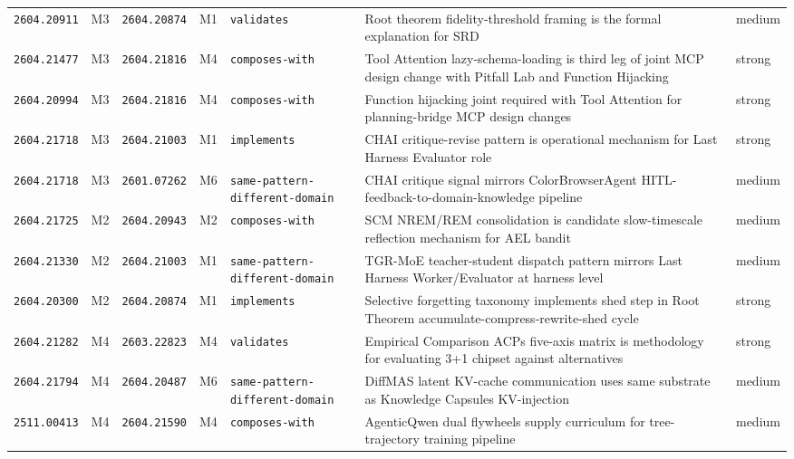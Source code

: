 \documentclass[11pt,letterpaper]{article}
\newcommand{\arxivid}[1]{\texttt{\textcolor{accent}{#1}}}
\begin{document}
\begin{footnotesize}
\begin{longtable}{@{}L{0.09\textwidth} L{0.03\textwidth} L{0.09\textwidth} L{0.03\textwidth} L{0.13\textwidth} L{0.40\textwidth} L{0.06\textwidth}@{}}
\arxivid{2604.20911} & M3 & \arxivid{2604.20874} & M1 & \texttt{\small validates} & Root theorem fidelity-threshold framing is the formal explanation for SRD & medium \\
\arxivid{2604.21477} & M3 & \arxivid{2604.21816} & M4 & \texttt{\small composes-with} & Tool Attention lazy-schema-loading is third leg of joint MCP design change with Pitfall Lab and Function Hijacking & strong \\
\arxivid{2604.20994} & M3 & \arxivid{2604.21816} & M4 & \texttt{\small composes-with} & Function hijacking joint required with Tool Attention for planning-bridge MCP design changes & strong \\
\arxivid{2604.21718} & M3 & \arxivid{2604.21003} & M1 & \texttt{\small implements} & CHAI critique-revise pattern is operational mechanism for Last Harness Evaluator role & strong \\
\arxivid{2604.21718} & M3 & \arxivid{2601.07262} & M6 & \texttt{\small same-pattern-different-domain} & CHAI critique signal mirrors ColorBrowserAgent HITL-feedback-to-domain-knowledge pipeline & medium \\
\arxivid{2604.21725} & M2 & \arxivid{2604.20943} & M2 & \texttt{\small composes-with} & SCM NREM/REM consolidation is candidate slow-timescale reflection mechanism for AEL bandit & medium \\
\arxivid{2604.21330} & M2 & \arxivid{2604.21003} & M1 & \texttt{\small same-pattern-different-domain} & TGR-MoE teacher-student dispatch pattern mirrors Last Harness Worker/Evaluator at harness level & medium \\
\arxivid{2604.20300} & M2 & \arxivid{2604.20874} & M1 & \texttt{\small implements} & Selective forgetting taxonomy implements shed step in Root Theorem accumulate-compress-rewrite-shed cycle & strong \\
\arxivid{2604.21282} & M4 & \arxivid{2603.22823} & M4 & \texttt{\small validates} & Empirical Comparison ACPs five-axis matrix is methodology for evaluating 3+1 chipset against alternatives & strong \\
\arxivid{2604.21794} & M4 & \arxivid{2604.20487} & M6 & \texttt{\small same-pattern-different-domain} & DiffMAS latent KV-cache communication uses same substrate as Knowledge Capsules KV-injection & medium \\
\arxivid{2511.00413} & M4 & \arxivid{2604.21590} & M4 & \texttt{\small composes-with} & AgenticQwen dual flywheels supply curriculum for tree-trajectory training pipeline & medium \\

\end{longtable}
\end{footnotesize}
\end{document}
